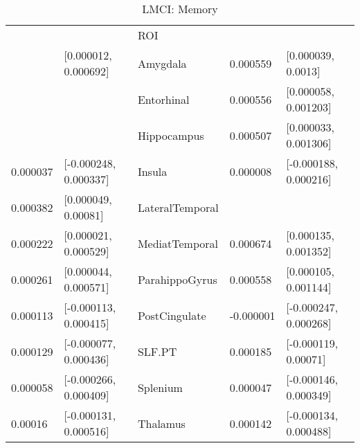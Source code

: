\documentclass{article}
\begin{document}
\begin{table}[H]
\centering
\caption{LMCI: Memory} 
\begin{tabular}{lllll}
  \toprule
\cellcolor{red!30}{B2} & \cellcolor{red!30}{CI} & ROI & \cellcolor{blue!30}{B3} & \cellcolor{blue!30}{CI} \\ 
  \rowcolor{green!30} \midrule
0.000272 & [0.000012, 0.000692] & Amygdala & 0.000559 & [0.000039, 0.0013] \\ 
   \rowcolor{blue!30}\cellcolor{white}{0.000128} & \cellcolor{white}{[-0.000063, 0.000439]} & Entorhinal & 0.000556 & [0.000058, 0.001203] \\ 
   \rowcolor{blue!30}\cellcolor{white}{0.000165} & \cellcolor{white}{[-0.000026, 0.000499]} & Hippocampus & 0.000507 & [0.000033, 0.001306] \\ 
  0.000037 & [-0.000248, 0.000337] & Insula & 0.000008 & [-0.000188, 0.000216] \\ 
   \rowcolor{red!30}0.000382 & [0.000049, 0.00081] & LateralTemporal & \cellcolor{white}{0.000155} & \cellcolor{white}{[-0.000194, 0.000608]} \\ 
   \rowcolor{green!30}0.000222 & [0.000021, 0.000529] & MediatTemporal & 0.000674 & [0.000135, 0.001352] \\ 
   \rowcolor{green!30}0.000261 & [0.000044, 0.000571] & ParahippoGyrus & 0.000558 & [0.000105, 0.001144] \\ 
  0.000113 & [-0.000113, 0.000415] & PostCingulate & -0.000001 & [-0.000247, 0.000268] \\ 
  0.000129 & [-0.000077, 0.000436] & SLF.PT & 0.000185 & [-0.000119, 0.00071] \\ 
  0.000058 & [-0.000266, 0.000409] & Splenium & 0.000047 & [-0.000146, 0.000349] \\ 
  0.00016 & [-0.000131, 0.000516] & Thalamus & 0.000142 & [-0.000134, 0.000488] \\ 
   \bottomrule
\end{tabular}
\end{table}
\end{document}
